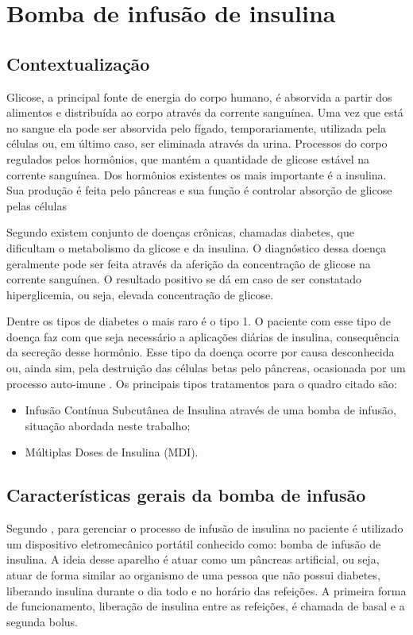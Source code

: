 \chapter{Bomba de infusão de insulina}
\label{cap:contexto_bomba}
\section{Contextualização}
Glicose, a principal fonte de energia do corpo humano, é absorvida a partir dos alimentos e distribuída ao corpo através da corrente sanguínea. Uma vez que está no sangue ela pode ser absorvida pelo fígado, temporariamente, utilizada pela células ou, em último caso, ser eliminada através da urina. Processos do corpo regulados pelos hormônios, que mantém a quantidade de glicose estável na corrente sanguínea. Dos hormônios existentes os mais importante é a insulina. Sua produção é feita pelo pâncreas e sua função é controlar absorção de glicose pelas células \cite{sbc2014}

Segundo \cite{sbc2014} existem conjunto de doenças crônicas, chamadas diabetes, que dificultam o metabolismo da glicose e da insulina. O diagnóstico dessa doença geralmente pode ser feita através da aferição da concentração de glicose na corrente sanguínea. O resultado positivo se dá em caso de ser constatado hiperglicemia, ou seja, elevada concentração de glicose.

Dentre os tipos de diabetes o mais raro é o tipo 1. O paciente com esse tipo de doença faz com que seja necessário a aplicações diárias de insulina, consequência da secreção desse hormônio. Esse tipo da doença ocorre por causa desconhecida ou, ainda sim, pela destruição das células betas pelo pâncreas, ocasionada por um processo auto-imune \cite{galvao2013requirements}. Os principais tipos tratamentos para o quadro citado são:
\begin{itemize}
\item Infusão Contínua Subcutânea de Insulina através de uma bomba de infusão, situação abordada neste trabalho;
\item Múltiplas Doses de Insulina (MDI).
\end{itemize}

\section{Características gerais da bomba de infusão}
Segundo \cite{minicucci2008uso}, para gerenciar o processo de infusão de insulina no paciente é utilizado um dispositivo eletromecânico portátil conhecido como: bomba de infusão de insulina. A ideia desse aparelho é atuar como um pâncreas artificial, ou seja, atuar de forma similar ao organismo de uma pessoa que não possui diabetes, liberando insulina durante o dia todo e no horário das refeições. A primeira forma de funcionamento, liberação de insulina entre as refeições, é chamada de basal e a segunda bolus.

